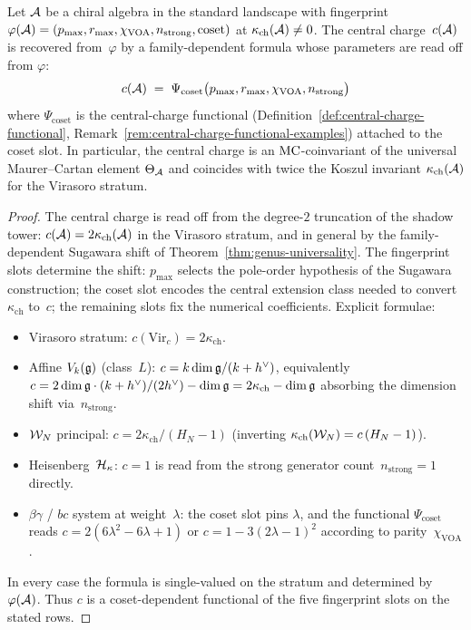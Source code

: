 \begin{theorem}
\label{thm:part-iii-central-charge-is-emergent}
Let $\mathcal{A}$ be a chiral algebra in the standard landscape with
fingerprint $\varphi(\mathcal{A}) = (p_{\max}, r_{\max}, \chi_{\mathrm{VOA}},
n_{\mathrm{strong}}, \mathrm{coset})$ at
$\kappa_{\mathrm{ch}}(\mathcal{A}) \ne 0$. The central charge~$c(\mathcal{A})$ is
recovered from~$\varphi$ by a family-dependent formula whose
parameters are read off from $\varphi$:
\begin{equation}
 c(\mathcal{A}) \;=\; \Psi_{\mathrm{coset}}\bigl(
 p_{\max}, r_{\max}, \chi_{\mathrm{VOA}},
 n_{\mathrm{strong}}\bigr)
 \label{eq:part-iii-central-charge-functional}
\end{equation}
where $\Psi_{\mathrm{coset}}$ is the central-charge functional
\textup{(}Definition~\ref{def:central-charge-functional},
Remark~\ref{rem:central-charge-functional-examples}\textup{)} attached
to the coset slot. In particular, the central charge is an
$\mathrm{MC}$-coinvariant of the universal Maurer--Cartan element
$\Theta_{\mathcal{A}}$ and coincides with twice the Koszul invariant
$\kappa_{\mathrm{ch}}(\mathcal{A})$ for the Virasoro stratum.
\end{theorem}
\begin{proof}
The central charge is read off from the degree-$2$ truncation of the
shadow tower: $c(\mathcal{A}) = 2\kappa_{\mathrm{ch}}(\mathcal{A})$ in the Virasoro
stratum, and in general by the family-dependent Sugawara shift of
Theorem~\ref{thm:genus-universality}. The fingerprint slots determine
the shift: $p_{\max}$ selects the pole-order hypothesis of the
Sugawara construction; the coset slot encodes the central extension
class needed to convert $\kappa_{\mathrm{ch}}$ to~$c$; the remaining
slots fix the numerical coefficients. Explicit formulae:
\begin{itemize}[leftmargin=*]
 \item Virasoro stratum: $c(\mathrm{Vir}_c) = 2\kappa_{\mathrm{ch}}$.
 \item Affine $V_k(\mathfrak{g})$ (class~$L$): $c = k \dim\mathfrak{g} / (k + h^\vee)$,
 equivalently $c = 2 \dim\mathfrak{g}\cdot(k + h^\vee)/ (2h^\vee) - \dim\mathfrak{g}
 = 2\kappa_{\mathrm{ch}} - \dim\mathfrak{g}$ absorbing the dimension shift
 via~$n_{\mathrm{strong}}$.
 \item $\mathcal{W}_N$ principal: $c = 2\kappa_{\mathrm{ch}} / (H_N - 1)$
 \textup{(}inverting
 $\kappa_{\mathrm{ch}}(\mathcal{W}_N) = c\,(H_N - 1)$\textup{)}.
 \item Heisenberg~$\mathcal{H}_\kappa$: $c = 1$ is read from the strong
 generator count~$n_{\mathrm{strong}} = 1$ directly.
 \item $\beta\gamma$ / $bc$ system at weight~$\lambda$: the coset slot
 pins $\lambda$, and the functional
 $\Psi_{\mathrm{coset}}$ reads $c = 2(6\lambda^2 - 6\lambda + 1)$ or
 $c = 1 - 3(2\lambda - 1)^2$ according to
 parity~$\chi_{\mathrm{VOA}}$.
\end{itemize}
In every case the formula is single-valued on the stratum and
determined by~$\varphi(\mathcal{A})$. Thus $c$ is a coset-dependent
functional of the five fingerprint slots on the stated rows.
\end{proof}

